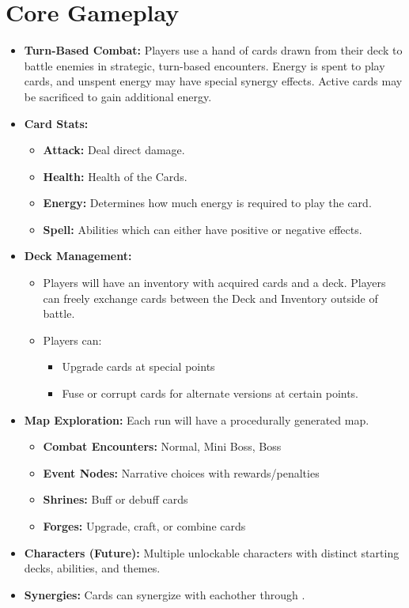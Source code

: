 \documentclass[10pt, a4paper]{article}
\begin{document}
	\section{Core Gameplay}
	\begin{itemize}
		\item \textbf{Turn-Based Combat:} Players use a hand of cards drawn from their deck to battle enemies in strategic, turn-based encounters. Energy is spent to play cards, and unspent energy may have special synergy effects. Active cards may be sacrificed to gain additional energy.
		
		\item \textbf{Card Stats:}
		\begin{itemize}
			\item \textbf{Attack:} Deal direct damage.
			\item \textbf{Health:} Health of the Cards.
			\item \textbf{Energy:} Determines how much energy is required to play the card.
			\item \textbf{Spell:} Abilities which can either have positive or negative effects.
		\end{itemize}
		
		\item \textbf{Deck Management:} 
		\begin{itemize}
		\item Players will have an inventory with acquired cards and a deck. Players can freely exchange cards between the Deck and Inventory outside of battle.
		\item Players can:
		\begin{itemize}
			\item Upgrade cards at special points
			\item Fuse or corrupt cards for alternate versions at certain points.
		\end{itemize}
	    \end{itemize}
		\item \textbf{Map Exploration:} Each run will have a procedurally generated map.
		\begin{itemize}
			\item \textbf{Combat Encounters:} Normal, Mini Boss, Boss
			\item \textbf{Event Nodes:} Narrative choices with rewards/penalties
			\item \textbf{Shrines:} Buff or debuff cards
			\item \textbf{Forges:} Upgrade, craft, or combine cards
		\end{itemize}
		
		\item \textbf{Characters (Future):} Multiple unlockable characters with distinct starting decks, abilities, and themes.
		
		\item \textbf{Synergies:} Cards can synergize with eachother through .
		\end{itemize}
\end{document}
